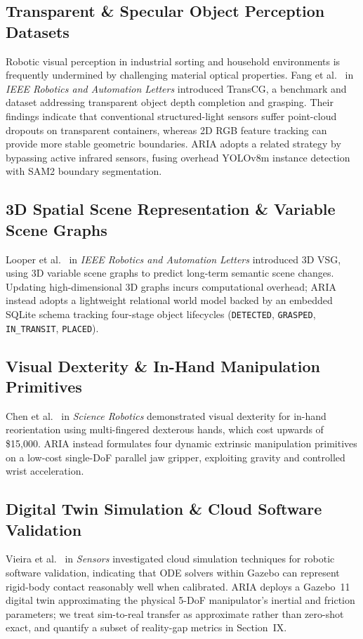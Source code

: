 \documentclass[journal]{IEEEtran}
\begin{document}
\subsection{Transparent \& Specular Object Perception Datasets}
Robotic visual perception in industrial sorting and household environments is frequently undermined by challenging material optical properties. Fang et al.~\cite{aria_131_fang_2022_transcg} in \textit{IEEE Robotics and Automation Letters} introduced TransCG, a benchmark and dataset addressing transparent object depth completion and grasping. Their findings indicate that conventional structured-light sensors suffer point-cloud dropouts on transparent containers, whereas 2D RGB feature tracking can provide more stable geometric boundaries. ARIA adopts a related strategy by bypassing active infrared sensors, fusing overhead YOLOv8m instance detection with SAM2 boundary segmentation.

\subsection{3D Spatial Scene Representation \& Variable Scene Graphs}
Looper et al.~\cite{aria_004_looper_2023_3d} in \textit{IEEE Robotics and Automation Letters} introduced 3D VSG, using 3D variable scene graphs to predict long-term semantic scene changes. Updating high-dimensional 3D graphs incurs computational overhead; ARIA instead adopts a lightweight relational world model backed by an embedded SQLite schema tracking four-stage object lifecycles (\texttt{DETECTED}, \texttt{GRASPED}, \texttt{IN\_TRANSIT}, \texttt{PLACED}).

\subsection{Visual Dexterity \& In-Hand Manipulation Primitives}
Chen et al.~\cite{aria_135_chen_2023_visual} in \textit{Science Robotics} demonstrated visual dexterity for in-hand reorientation using multi-fingered dexterous hands, which cost upwards of \$15{,}000. ARIA instead formulates four dynamic extrinsic manipulation primitives on a low-cost single-DoF parallel jaw gripper, exploiting gravity and controlled wrist acceleration.

\subsection{Digital Twin Simulation \& Cloud Software Validation}
Vieira et al.~\cite{aria_117_vieira_2025_application} in \textit{Sensors} investigated cloud simulation techniques for robotic software validation, indicating that ODE solvers within Gazebo can represent rigid-body contact reasonably well when calibrated. ARIA deploys a Gazebo~11 digital twin approximating the physical 5-DoF manipulator's inertial and friction parameters; we treat sim-to-real transfer as approximate rather than zero-shot exact, and quantify a subset of reality-gap metrics in Section~IX.
\end{document}
